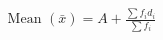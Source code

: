 \documentclass[preview]{standalone}
\begin{document}
\begin{align*}
\text{Mean } (\bar{x}) = A + \frac{\sum f_i d_i}{\sum f_i}
\end{align*}
\end{document}
